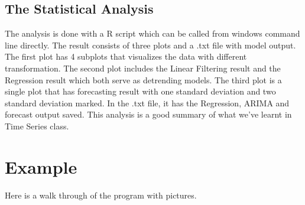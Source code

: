 \documentclass[12pt]{article}
\begin{document}
\begin{center}
\end{center}


\subsection{The Statistical Analysis}

The analysis is done with a R script which can be called from windows command line directly. 
The result consists of three plots and a .txt file with model output. 
The first plot has 4 subplots that visualizes the data with different transformation.
The second plot includes the Linear Filtering result and the Regression result which both serve as detrending models.
The third plot is a single plot that has forecasting result with one standard deviation and two standard deviation marked.
In the .txt file, it has the Regression, ARIMA and forecast output saved. 
This analysis is a good summary of what we've learnt in Time Series class.

\section{Example}  

Here is a walk through of the program with pictures.
\end{document}
